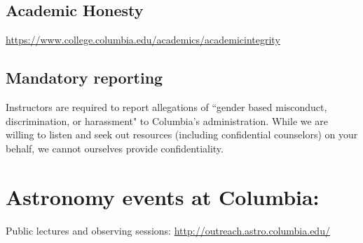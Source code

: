 \documentclass[11pt]{article}
\begin{document}
\subsection*{Academic Honesty}
\url{https://www.college.columbia.edu/academics/academicintegrity}
 
\subsection*{Mandatory reporting}
Instructors are required to report allegations of ``gender based misconduct, discrimination, or harassment" to Columbia's administration. While we are willing to listen and seek out resources (including confidential counselors) on your behalf, we cannot ourselves provide confidentiality.

\section*{Astronomy events at Columbia:}
Public lectures and observing sessions: \url{http://outreach.astro.columbia.edu/}
\end{document}
